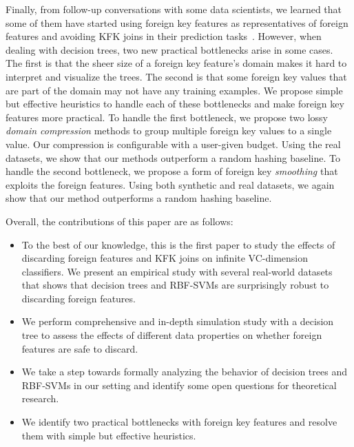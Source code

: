 \documentclass[sigconf]{acmart}
\newenvironment{packeditems}{
\begin{itemize}
  \setlength{\itemsep}{1pt}
  \setlength{\parskip}{0pt}
  \setlength{\parsep}{0pt}
}{\end{itemize}}
\begin{document}
Finally, from follow-up conversations with some data scientists, we learned that some of them have started using foreign key features as representatives of foreign features and avoiding 
KFK joins in their prediction tasks~\cite{conv}. However, when dealing with decision trees, two new practical bottlenecks arise in some cases. The first is that the sheer size of a foreign 
key feature's domain makes it hard to interpret and visualize the trees. The second is that some foreign key values that are part of the domain may not have any training examples. 
We propose simple but effective heuristics to handle each of these bottlenecks and make foreign key features more practical. To handle the first bottleneck, we propose two lossy
\textit{domain compression} methods to group multiple foreign key values to a single value. Our compression is configurable with a user-given budget. Using the real datasets, 
we show that our methods outperform a random hashing baseline. To handle the second bottleneck, we propose a form of foreign key \textit{smoothing} that exploits the foreign features. 
Using both synthetic and real datasets, we again show that our method outperforms a random hashing baseline.

\vspace{1mm}
\noindent Overall, the contributions of this paper are as follows:

\begin{packeditems}
\item To the best of our knowledge, this is the first paper to study the effects of discarding foreign features and KFK joins on infinite VC-dimension classifiers.
We present an empirical study with several real-world datasets that shows that decision trees and RBF-SVMs are surprisingly robust to discarding foreign features.

\item We perform comprehensive and in-depth simulation study with a decision tree to assess the effects of different data properties on whether foreign features are safe to discard.

\item We take a step towards formally analyzing the behavior of decision trees and RBF-SVMs in our setting and identify some open questions for theoretical research.

\item We identify two practical bottlenecks with foreign key features and resolve them with simple but effective heuristics.
\end{packeditems}
\end{document}
